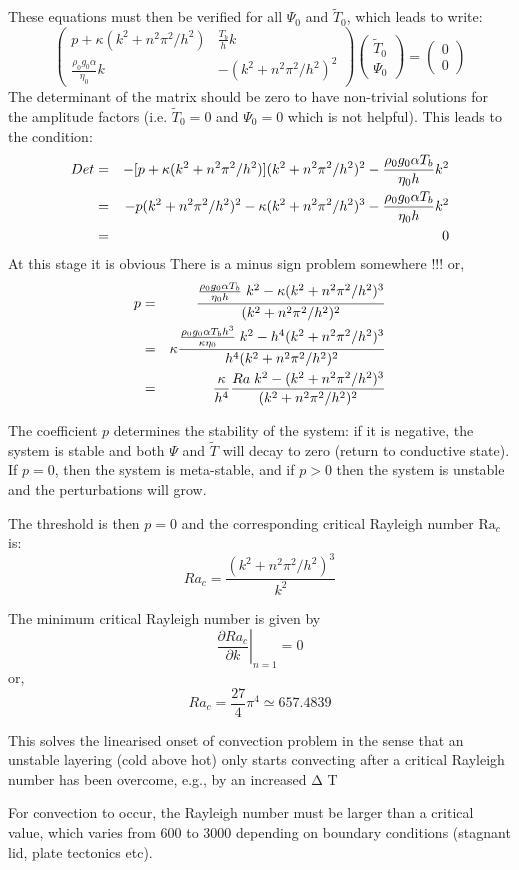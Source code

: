 These equations must then be verified for all $\Psi_0$ and $\tilde{T}_0$, 
which leads to write:
\[
\left(
\begin{array}{cc}
p + \kappa (k^2+n^2\pi^2/h^2) & \frac{T_b}{h} k \\
\frac{\rho_0 g_0 \alpha}{\eta_0}  k  & -(k^2+n^2\pi^2/h^2)^2 
\end{array}
\right)
\left(
\begin{array}{c}
\tilde{T}_0 \\ \Psi_0
\end{array}
\right)
=
\left(
\begin{array}{c}
0 \\ 0
\end{array}
\right)
\]
The determinant of the matrix should be zero to have non-trivial solutions for
the amplitude factors (i.e. $\tilde{T}_0=0$ and $\Psi_0=0$ which is not helpful).
This leads to the condition: 
\begin{eqnarray}
Det 
&=& -[p + \kappa (k^2+n^2\pi^2/h^2)](k^2+n^2\pi^2/h^2)^2 - \frac{\rho_0 g_0 \alpha T_b }{\eta_0 h}  k^2 \nonumber\\
&=& -p (k^2+n^2\pi^2/h^2)^2 - \kappa (k^2+n^2\pi^2/h^2)^3 - \frac{\rho_0 g_0 \alpha T_b }{\eta_0 h}  k^2 \nonumber\\
&=& 0
\end{eqnarray}
{\color{red}At this stage it is obvious There is a minus sign problem somewhere !!!}
or, 
\begin{eqnarray}
p 
&=&\frac{\frac{\rho_0 g_0 \alpha T_b }{\eta_0 h }  \; k^2 
- \kappa (k^2+n^2\pi^2/h^2)^3 }{ (k^2+n^2\pi^2/h^2)^2} \nonumber\\
&=& \kappa \frac{  \frac{\rho_0 g_0 \alpha T_b h^3}{ \kappa \eta_0}\; k^2 - h^4 (k^2+n^2\pi^2/h^2)^3 }{h^4 (k^2+n^2\pi^2/h^2)^2} \nonumber\\
&=& \frac{\kappa}{h^4}   \frac{Ra \; k^2 -(k^2+n^2\pi^2/h^2)^3 }{ (k^2+n^2\pi^2/h^2)^2}
\end{eqnarray}

The coefficient $p$ determines the stability of the system: if it is negative, 
the system is stable and both $\Psi$ and $\tilde{T}$ will decay to zero (return to conductive state). 
If $p=0$, then the system is meta-stable, and if $p>0$ then the system is unstable and 
the perturbations will grow. 

The threshold is then $p=0$ and the corresponding critical Rayleigh number $\text{Ra}_c$ is:
\[
Ra_c=\frac{(k^2+n^2\pi^2/h^2)^3}{k^2}
\]

The minimum critical Rayleigh number is given by 
\[
\left. \frac{\partial Ra_c}{\partial k}\right|_{n=1}=0
\]
or, 
\[
Ra_c = \frac{27}{4}\pi^4 \simeq 657.4839
\]


This solves the linearised onset of convection problem in the sense that an
unstable layering (cold above hot) only starts convecting after a critical
Rayleigh number has been overcome, e.g., by an increased Δ T



For convection to occur,
the Rayleigh number must be larger than a critical value,
which varies from 600 to 3000 depending 
on boundary conditions (stagnant lid, plate tectonics etc).	

